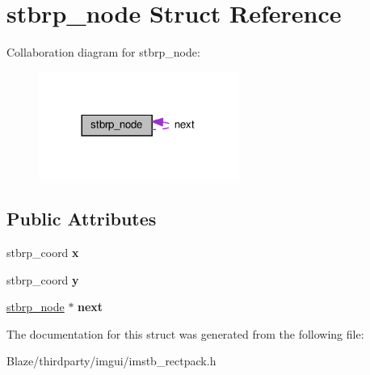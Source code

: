 \hypertarget{structstbrp__node}{}\section{stbrp\+\_\+node Struct Reference}
\label{structstbrp__node}


Collaboration diagram for stbrp\+\_\+node\+:\nopagebreak
\begin{figure}[H]
\begin{center}
\leavevmode
\includegraphics[width=185pt]{structstbrp__node__coll__graph}
\end{center}
\end{figure}
\subsection*{Public Attributes}
\begin{DoxyCompactItemize}
\item 
\mbox{\label{structstbrp__node_a45ab31a88025db27d08040d715b129ea}} 
stbrp\+\_\+coord {\bfseries x}
\item 
\mbox{\label{structstbrp__node_ad0415cb102a4f37aa45073653307e67e}} 
stbrp\+\_\+coord {\bfseries y}
\item 
\mbox{\label{structstbrp__node_a933cb2dd6cddc4fcaf10e3b40634bed4}} 
\hyperlink{structstbrp__node}{stbrp\+\_\+node} $\ast$ {\bfseries next}
\end{DoxyCompactItemize}


The documentation for this struct was generated from the following file\+:\begin{DoxyCompactItemize}
\item 
Blaze/thirdparty/imgui/imstb\+\_\+rectpack.\+h\end{DoxyCompactItemize}
